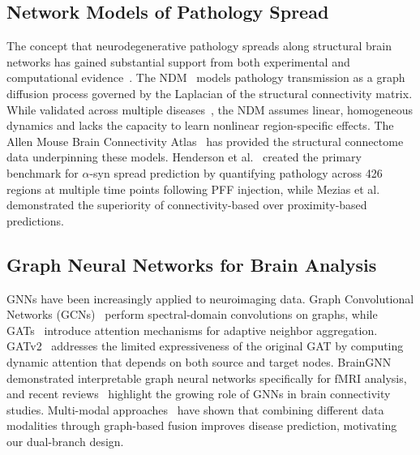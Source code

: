 \documentclass[conference]{IEEEtran}
\begin{document}
\subsection{Network Models of Pathology Spread}
The concept that neurodegenerative pathology spreads along structural brain networks has gained substantial support from both experimental and computational evidence~\cite{raj2018models}. The NDM~\cite{raj2012network} models pathology transmission as a graph diffusion process governed by the Laplacian of the structural connectivity matrix. While validated across multiple diseases~\cite{cornblath2020defining}, the NDM assumes linear, homogeneous dynamics and lacks the capacity to learn nonlinear region-specific effects. The Allen Mouse Brain Connectivity Atlas~\cite{oh2014mesoscale} has provided the structural connectome data underpinning these models. Henderson et al.~\cite{henderson2019spread} created the primary benchmark for $\alpha$-syn spread prediction by quantifying pathology across 426 regions at multiple time points following PFF injection, while Mezias et al.~\cite{mezias2020neural} demonstrated the superiority of connectivity-based over proximity-based predictions.

\subsection{Graph Neural Networks for Brain Analysis}
GNNs have been increasingly applied to neuroimaging data. Graph Convolutional Networks (GCNs)~\cite{kipf2017semi} perform spectral-domain convolutions on graphs, while GATs~\cite{velickovic2018graph} introduce attention mechanisms for adaptive neighbor aggregation. GATv2~\cite{brody2022how} addresses the limited expressiveness of the original GAT by computing dynamic attention that depends on both source and target nodes. BrainGNN~\cite{li2021braingnn} demonstrated interpretable graph neural networks specifically for fMRI analysis, and recent reviews~\cite{shojaie2025graph} highlight the growing role of GNNs in brain connectivity studies. Multi-modal approaches~\cite{zheng2022multi, zhao2025multimodal} have shown that combining different data modalities through graph-based fusion improves disease prediction, motivating our dual-branch design.
\end{document}
